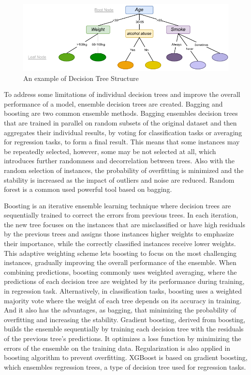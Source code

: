 \documentclass[12pt,a4paper,english
]{tunithesis}
\begin{document}
\begin{figure}
  \begin{center}
    \includegraphics[width=1\textwidth]{thesis/img/decision_tree.pdf}
  \end{center}
  \caption[Decision Tree]{An example of Decision Tree Structure}
  \label{fig:decision_tree}
\end{figure}

To address some limitations of individual decision trees and improve the overall performance of a model, ensemble decision trees are created. Bagging and boosting are two common ensemble methods. Bagging ensembles decision trees that are trained in parallel on random subsets of the original dataset and then aggregates their individual results, by voting for classification tasks or averaging for regression tasks, to form a final result. This means that some instances may be repeatedly selected, however, some may be not selected at all, which introduces further randomness and decorrelation between trees. Also with the random selection of instances, the probability of overfitting is minimized and the stability is increased as the impact of outliers and noise are reduced. Random forest is a common used powerful tool based on bagging.

Boosting is an iterative ensemble learning technique where decision trees are sequentially trained to correct the errors from previous trees. In each iteration, the new tree focuses on the instances that are misclassified or have high residuals by the previous trees and assigns those instances higher weights to emphasize their importance, while the correctly classified instances receive lower weights. This adaptive weighting scheme lets boosting to focus on the most challenging instances, gradually improving the overall performance of the ensemble. When combining predictions, boosting commonly uses weighted averaging, where the predictions of each decision tree are weighted by its performance during training, in regression task. Alternatively, in classification tasks, boosting uses a weighted majority vote where the weight of each tree depends on its accuracy in training. And it also has the advantages, as bagging, that minimizing the probability of overfitting and increasing the stability. Gradient boosting, derived from boosting, builds the ensemble sequentially by training each decision tree with the residuals of the previous tree's predictions. It optimizes a loss function by minimizing the errors of the ensemble on the training data. Regularization is also applied in boosting algorithm to prevent overfitting. XGBoost is based on gradient boosting, which ensembles regression trees, a type of decision tree used for regression tasks.
\end{document}
